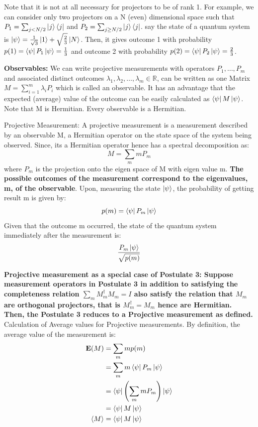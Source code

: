 \begin{example}
    Note that it is not at all necessary for projectors to be of rank 1. For example, we can consider only two projectors on a 
    N (even) dimensional space such that $P_1=\sum_{j<N/2} \ket{j}\bra{j}$ and $P_2=\sum_{j\geq N/2} \ket{j}\bra{j}$. say the state
    of a quantum system is $\ket{\psi}=\frac{1}{\sqrt{3}}\ket{1}+\sqrt{\frac{2}{3}}\ket{N}$. Then,
    it gives outcome 1 with probability $p(1)=\bra{\psi}P_1\ket{\psi}=\frac{1}{3}$ and outcome 2 with probability $p(2)=\bra{\psi}P_2\ket{\psi} = \frac{2}{3}$.

\end{example}

\textbf{Observables: }We can write projective measurements with operators $P_1,\ldots,P_m$ and associated 
distinct outcomes $\lambda_1,\lambda_2,\ldots,\lambda_m \in \mathbb{R}$, can be written as one Matrix $M=\sum_{i=1}^m \lambda_iP_i$ which
is called an observable. It has an advantage that the expected (average) value of the outcome can be easily calculated as $\bra{\psi}M\ket{\psi}$.
Note that M is Hermitian. Every observable is a Hermitian.

\begin{definition}
    Projective Measurement: A projective measurement is a measurement described by an observable M, a Hermitian operator on the state space of the system
    being observed. Since, its a Hermitian operator hence has a spectral decomposition as:
    \[M=\sum_m mP_m\]
    where $P_m$ is the projection onto the eigen space of M with eigen value m. 
    \textbf{The possible outcomes of the measurement correspond to the eigenvalues, m, of the observable}. Upon,
    measuring the state $\ket{\psi}$, the probability of getting result m is given by:
    \[p(m)=\bra{\psi}P_m\ket{\psi}\]
    Given that the outcome m occurred, the state of the quantum system immediately after the measurement is:
    \[\dfrac{P_m\ket{\psi}}{\sqrt{p(m)}}\]
\end{definition}

\textbf{Projective measurement as a special case of Postulate 3: Suppose measurement operators in Postulate 3 in addition to satisfying the 
completeness relation $\sum_m M_m^{\dagger}M_m=I$ also satisfy the relation that $M_m$ are orthogonal projectors, that is $M_m^{\dagger}=M_m$
hence are Hermitian. Then, the Postulate 3 reduces to a Projective measurement as defined.}
Calculation of Average values for Projective measurements. By definition, the average value of the measurement is:
\begin{align*}
    \mathbf{E}(M) &= \sum_m m p(m) \\
    &= \sum_m m \bra{\psi}P_m\ket{\psi} \\
    &= \bra{\psi}\left(\sum_m mP_m\right)\ket{\psi} \\
    &= \bra{\psi}M\ket{\psi}\\
    \braket{M}&=\bra{\psi}M\ket{\psi}
\end{align*}

